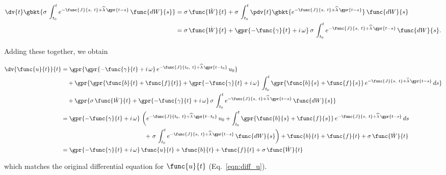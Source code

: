 \begin{align}
    \dv{t} \gbkt{\sigma\,\int_{t_{0}}^{t} e^{-\func{J}{s,\ t} + \widehat{\lambda}\,\gpr{t - s}}\,\func{dW}{s}} &= \sigma\,\func{\dot{W}}{t} + \sigma\,\int_{t_{0}}^{t} \pdv{t} \gbkt{e^{-\func{J}{s,\ t} + \widehat{\lambda}\,\gpr{t - s}}}\,\func{dW}{s} \nonumber \\
    	&= \sigma\,\func{\dot{W}}{t} + \gpr{-\func{\gamma}{t} + i\,\omega}\,\sigma\,\int_{t_{0}}^{t} e^{-\func{J}{s,\ t} + \widehat{\lambda}\,\gpr{t - s}}\,\func{dW}{s}.
\end{align}

Adding these together, we obtain

\begin{align}
    \dv{\func{u}{t}}{t} &= \gpr{\gpr{-\func{\gamma}{t} + i\,\omega}\,e^{-\func{J}{t_0,\ t} + \widehat{\lambda}\,\gpr{t - t_0}}\,u_0} \nonumber \\
    	&\quad + \gpr{\gpr{\func{b}{t} + \func{f}{t}} + \gpr{-\func{\gamma}{t} + i\,\omega}\,\int_{t_0}^{t} \gpr{\func{b}{s} + \func{f}{s}}\,e^{-\func{J}{s,\ t} + \widehat{\lambda}\,\gpr{t - s}}\,ds} \nonumber \\
    	&\quad + \gpr{\sigma\,\func{\dot{W}}{t} + \gpr{-\func{\gamma}{t} + i\,\omega}\,\sigma\,\int_{t_{0}}^{t} e^{-\func{J}{s,\ t} + \widehat{\lambda}\,\gpr{t - s}}\,\func{dW}{s}} \nonumber \\
    	&= \gpr{-\func{\gamma}{t} + i\,\omega}\,\left(e^{-\func{J}{t_0,\ t} + \widehat{\lambda}\,\gpr{t - t_0}}\,u_0 + \int_{t_0}^{t} \gpr{\func{b}{s} + \func{f}{s}}\,e^{-\func{J}{s,\ t} + \widehat{\lambda}\,\gpr{t - s}}\,ds \right. \nonumber \\
    	&\qquad \phantom{\gpr{-\func{\gamma}{t} + i\,\omega}} \left. +\ \sigma\,\int_{t_{0}}^{t} e^{-\func{J}{s,\ t} + \widehat{\lambda}\,\gpr{t - s}}\,\func{dW}{s}\right) + \func{b}{t} + \func{f}{t} + \sigma\,\func{\dot{W}}{t} \nonumber \\
    	& = \gpr{-\func{\gamma}{t} + i\,\omega}\,\func{u}{t} + \func{b}{t} + \func{f}{t} + \sigma\,\func{\dot{W}}{t} 
\end{align}

which matches the original differential equation for $\func{u}{t}$ (Eq.~\ref{eqn:diff_u}). 